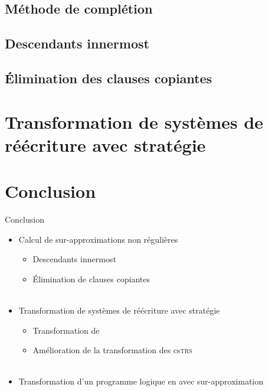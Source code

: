 \documentclass[xcolor={dvipsnames}]{beamer}
\begin{document}
\subsection{Méthode de complétion}


\subsection{Descendants innermost}


\subsection{Élimination des clauses copiantes}


\section{Transformation de systèmes de réécriture avec stratégie}


\section{Conclusion}

\begin{frame}{Conclusion}
  \begin{itemize}[<+->]
  \item Calcul de sur-approximations non régulières
    \begin{itemize}
    \item Descendants innermost
    \item Élimination de clauses copiantes \\~
    \end{itemize}
  \item Transformation de systèmes de réécriture avec stratégie
    \begin{itemize}
    \item Transformation de \pctrs
    \item Amélioration de la transformation des cs\textsc{trs} \\ ~
    \end{itemize}
  \item Transformation d'un programme logique en \csprogramme avec sur-approximation
  \end{itemize}
\end{frame}
\end{document}

